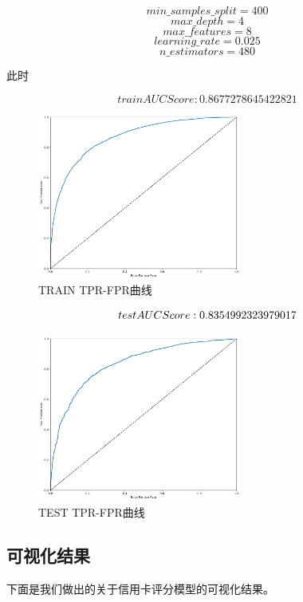\documentclass[UTF8,a4paper,10pt]{ctexart}
\begin{document}
$$
	min\_samples\_split=400
$$ 
$$
	max\_depth=4
$$ 
$$
	max\_features=8
$$ 
$$
	learning\_rate=0.025
$$ 
$$
	n\_estimators=480
$$

此时

$$
	train AUC Score: 0.8677278645422821
$$


\begin{figure}[htbp]
	\centering
	\includegraphics[width=0.6\textwidth]{train.png} %
	\caption{TRAIN TPR-FPR曲线} %
	\label{7} %
\end{figure}

$$test AUC Score: 0.8354992323979017\\$$
\begin{figure}[htbp]
	\centering
	\includegraphics[width=0.6\textwidth]{test.png} %
	\caption{TEST TPR-FPR曲线} %
	\label{8} %
\end{figure}

\subsection{可视化结果}
下面是我们做出的关于信用卡评分模型的可视化结果。
\end{document}
